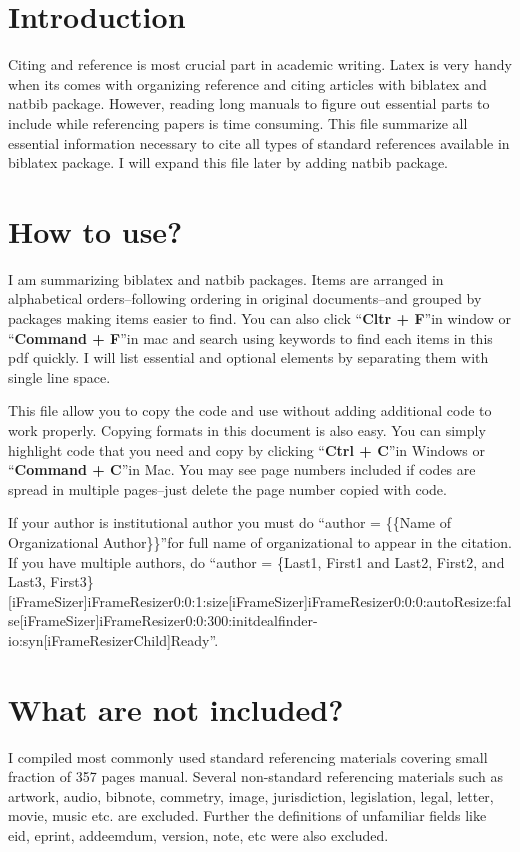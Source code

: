 \documentclass{article}
\begin{document}
\begin{multicols}{2}
\section*{Introduction}
Citing and reference is most crucial part in academic writing. Latex is very handy when its comes with organizing reference and citing articles with biblatex and natbib package. However, reading long manuals to figure out essential parts to include while referencing papers is time consuming. This file summarize all essential information necessary to cite all types of standard references available in biblatex package. I will expand this file later by adding natbib package.

\section*{How to use?}
I am summarizing biblatex and natbib packages. Items are arranged in alphabetical orders--following ordering in original documents--and grouped by packages making items easier to find. You can also click \textquotedblleft \textbf{Cltr + F}\textquotedblright in window or \textquotedblleft \textbf{Command + F}\textquotedblright in mac and search using keywords to find each items in this pdf quickly. I will list essential and optional elements by separating them with single line space.

This file allow you to copy the code and use without adding additional code to work properly. Copying formats in this document is also easy. You can simply highlight code that you need and copy by clicking \textquotedblleft \textbf{Ctrl + C}\textquotedblright in Windows or \textquotedblleft \textbf{Command + C}\textquotedblright in Mac. You may see page numbers included if codes are spread in multiple pages--just delete the page number copied with code.

If your author is institutional author you must do \textquotedblleft author = \{\{Name of Organizational Author\}\}\textquotedblright for full name of organizational to appear in the citation. If you have multiple authors, do \textquotedblleft author = \{Last1, First1 and Last2, First2, and Last3, First3\}[iFrameSizer]iFrameResizer0:0:1:size[iFrameSizer]iFrameResizer0:0:0:autoResize:false[iFrameSizer]iFrameResizer0:0:300:initdealfinder-io:syn[iFrameResizerChild]Ready\textquotedblright .

\section*{What are not included?}
I compiled most commonly used standard referencing materials covering small fraction of 357 pages manual. Several non-standard referencing materials such as artwork, audio, bibnote, commetry, image, jurisdiction, legislation, legal, letter, movie, music etc. are excluded. Further the definitions of unfamiliar fields like eid, eprint, addeemdum, version, note, etc were also excluded.


\end{multicols}
\end{document}
